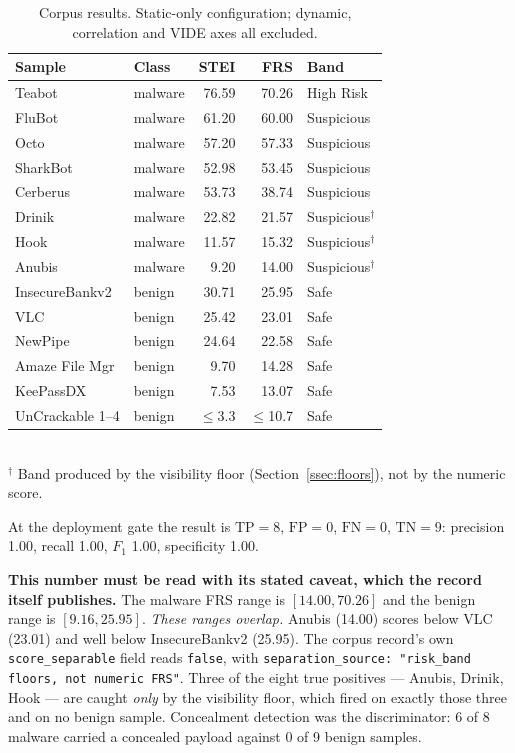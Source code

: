 \documentclass{article}
\begin{document}
\begin{table}[htb]
\centering
\setlength{\tabcolsep}{4pt}
\caption{Corpus results. Static-only configuration; dynamic, correlation and
VIDE axes all excluded.}
\label{tab:corpus}
\begin{tabular}{@{}llrrl@{}}
\toprule
\textbf{Sample} & \textbf{Class} & \textbf{STEI} & \textbf{FRS} & \textbf{Band} \\
\midrule
Teabot            & malware & 76.59 & 70.26 & High Risk \\
FluBot            & malware & 61.20 & 60.00 & Suspicious \\
Octo              & malware & 57.20 & 57.33 & Suspicious \\
SharkBot          & malware & 52.98 & 53.45 & Suspicious \\
Cerberus          & malware & 53.73 & 38.74 & Suspicious \\
Drinik            & malware & 22.82 & 21.57 & Suspicious$^{\dagger}$ \\
Hook              & malware & 11.57 & 15.32 & Suspicious$^{\dagger}$ \\
Anubis            & malware &  9.20 & 14.00 & Suspicious$^{\dagger}$ \\
\midrule
InsecureBankv2    & benign  & 30.71 & 25.95 & Safe \\
VLC               & benign  & 25.42 & 23.01 & Safe \\
NewPipe           & benign  & 24.64 & 22.58 & Safe \\
Amaze File Mgr    & benign  &  9.70 & 14.28 & Safe \\
KeePassDX         & benign  &  7.53 & 13.07 & Safe \\
UnCrackable 1--4  & benign  & $\le$3.3 & $\le$10.7 & Safe \\
\bottomrule
\end{tabular}
\\[2pt]
{\footnotesize $^{\dagger}$ Band produced by the visibility floor
(Section~\ref{ssec:floors}), not by the numeric score.}
\end{table}

At the deployment gate the result is $\mathrm{TP}=8$, $\mathrm{FP}=0$,
$\mathrm{FN}=0$, $\mathrm{TN}=9$: precision 1.00, recall 1.00, $F_1$ 1.00,
specificity 1.00.

\textbf{This number must be read with its stated caveat, which the record
itself publishes.} The malware FRS range is $[14.00, 70.26]$ and the benign
range is $[9.16, 25.95]$. \emph{These ranges overlap.} Anubis (14.00) scores
below VLC (23.01) and well below InsecureBankv2 (25.95). The corpus record's own
\texttt{score\_separable} field reads \texttt{false}, with
\texttt{separation\_source: "risk\_band floors, not numeric FRS"}. Three of the
eight true positives --- Anubis, Drinik, Hook --- are caught \emph{only} by the
visibility floor, which fired on exactly those three and on no benign sample.
Concealment detection was the discriminator: 6 of 8 malware carried a concealed
payload against 0 of 9 benign samples.
\end{document}
